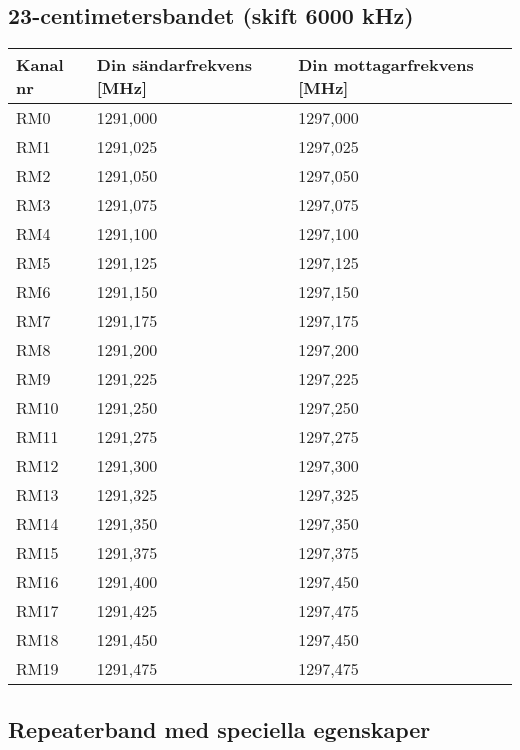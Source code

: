 \subsection{23-centimetersbandet (skift 6000 kHz)}
\begin{tabular}{ l | l | l }
  Kanal nr & Din sändarfrekvens [MHz] & Din mottagarfrekvens [MHz] \\
  \hline
  RM0 & 1291,000 & 1297,000 \\
  RM1 & 1291,025 & 1297,025 \\
  RM2 & 1291,050 & 1297,050 \\
  RM3 & 1291,075 & 1297,075 \\
  RM4 & 1291,100 & 1297,100 \\
  RM5 & 1291,125 & 1297,125 \\
  RM6 & 1291,150 & 1297,150 \\
  RM7 & 1291,175 & 1297,175 \\
  RM8 & 1291,200 & 1297,200 \\
  RM9 & 1291,225 & 1297,225 \\
  RM10 & 1291,250 & 1297,250 \\
  RM11 & 1291,275 & 1297,275 \\
  RM12 & 1291,300 & 1297,300 \\
  RM13 & 1291,325 & 1297,325 \\
  RM14 & 1291,350 & 1297,350 \\
  RM15 & 1291,375 & 1297,375 \\
  RM16 & 1291,400 & 1297,450 \\
  RM17 & 1291,425 & 1297,475 \\
  RM18 & 1291,450 & 1297,450 \\
  RM19 & 1291,475 & 1297,475 \\
\end{tabular}

\subsection{Repeaterband med speciella egenskaper}

